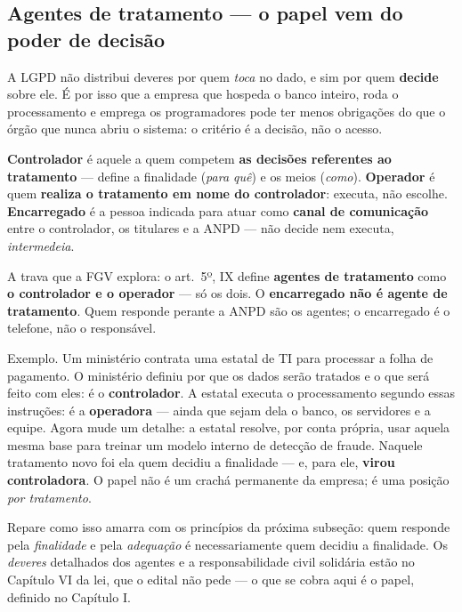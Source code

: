 \subsection{Agentes de tratamento --- o papel vem do poder de decisão}

A LGPD não distribui deveres por quem \emph{toca} no dado, e sim por quem
\textbf{decide} sobre ele. É por isso que a empresa que hospeda o banco
inteiro, roda o processamento e emprega os programadores pode ter menos
obrigações do que o órgão que nunca abriu o sistema: o critério é a decisão,
não o acesso.

\begin{conceito}
\textbf{Controlador} é aquele a quem competem \textbf{as decisões referentes
ao tratamento} --- define a finalidade (\emph{para quê}) e os meios
(\emph{como}). \textbf{Operador} é quem \textbf{realiza o tratamento em nome
do controlador}: executa, não escolhe. \textbf{Encarregado} é a pessoa
indicada para atuar como \textbf{canal de comunicação} entre o controlador, os
titulares e a ANPD --- não decide nem executa, \emph{intermedeia}.

A trava que a FGV explora: o art.\ 5º, IX define \textbf{agentes de
tratamento} como \textbf{o controlador e o operador} --- só os dois. O
\textbf{encarregado não é agente de tratamento}. Quem responde perante a ANPD
são os agentes; o encarregado é o telefone, não o responsável.
\end{conceito}

Exemplo. Um ministério contrata uma estatal de TI para processar a folha de
pagamento. O ministério definiu por que os dados serão tratados e o que será
feito com eles: é o \textbf{controlador}. A estatal executa o processamento
segundo essas instruções: é a \textbf{operadora} --- ainda que sejam dela o
banco, os servidores e a equipe. Agora mude um detalhe: a estatal resolve, por
conta própria, usar aquela mesma base para treinar um modelo interno de
detecção de fraude. Naquele tratamento novo foi ela quem decidiu a finalidade
--- e, para ele, \textbf{virou controladora}. O papel não é um crachá
permanente da empresa; é uma posição \emph{por tratamento}.

Repare como isso amarra com os princípios da próxima subseção: quem responde
pela \emph{finalidade} e pela \emph{adequação} é necessariamente quem decidiu
a finalidade. Os \emph{deveres} detalhados dos agentes e a responsabilidade
civil solidária estão no Capítulo VI da lei, que o edital não pede --- o que
se cobra aqui é o papel, definido no Capítulo I.

